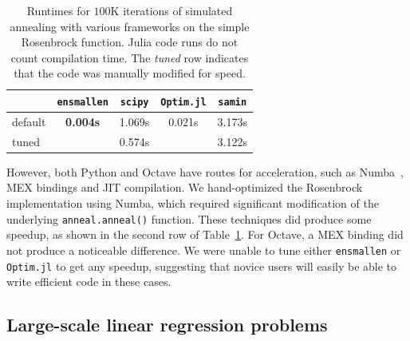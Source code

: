 \begin{table}[t!]
\begin{center}
\begin{tabular}{lcccc}
\toprule
 & {\tt ensmallen} & {\tt scipy} & {\tt Optim.jl} & {\tt samin} \\
\midrule
default & {\bf 0.004s} & 1.069s & 0.021s & 3.173s \\
tuned & & 0.574s & & 3.122s \\
\bottomrule
\end{tabular}
\end{center}
\vspace*{-0.5em}
\caption{Runtimes for $100$K iterations of simulated annealing with various
frameworks on the simple Rosenbrock function.  Julia code runs do not count
compilation time.  The {\it tuned} row indicates that the code was manually
modified for speed.}
\label{tab:rosenbrock_results}
\end{table}

However, both Python and Octave have routes for acceleration,
such as Numba~\cite{lam2015numba}, MEX bindings and JIT compilation.
We hand-optimized the Rosenbrock implementation using Numba,
which required significant modification of the
underlying \texttt{anneal.anneal()} function.
These techniques did produce some speedup,
as shown in the second row of Table~\ref{tab:rosenbrock_results}.
For Octave, a MEX binding did not produce a noticeable difference.
We were unable to tune either \texttt{ensmallen} or \texttt{
Optim.jl} to get any speedup, suggesting that novice users will easily be able
to write efficient code in these cases.

\subsection{Large-scale linear regression problems}

